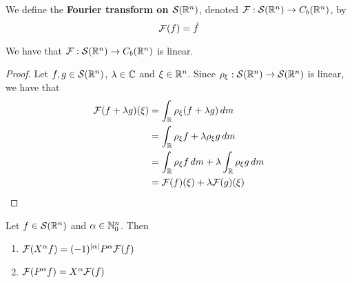 \documentclass{book}
\begin{document}
	\begin{defn}
		We define the \textbf{Fourier transform on $\mathcal{S}(\mathbb{R}^n)$}, denoted $\mathcal{F}: \mathcal{S}(\mathbb{R}^n) \rightarrow C_b(\mathbb{R}^n)$, by 
		$$\mathcal{F}(f) = \hat{f}$$
	\end{defn}
	
	\begin{ex}
		We have that $\mathcal{F}: \mathcal{S}(\mathbb{R}^n) \rightarrow C_b(\mathbb{R}^n)$ is linear. 
	\end{ex}
	
	\begin{proof}
		Let $f,g \in \mathcal{S}(\mathbb{R}^n)$, $\lambda \in \mathbb{C}$ and $\xi \in \mathbb{R}^n$. Since $\rho_{\xi}: \mathcal{S}(\mathbb{R}^n) \rightarrow \mathcal{S}(\mathbb{R}^n)$ is linear, we have that 
		\begin{align*}
			\mathcal{F}(f + \lambda g)(\xi) 
			& = \int_{\mathbb{R}} \rho_{\xi} (f + \lambda g) \, d m \\
			& = \int_{\mathbb{R}} \rho_{\xi}f + \lambda \rho_{\xi} g \, d m \\
			& = \int_{\mathbb{R}} \rho_{\xi} f \, d m + \lambda \int_{\mathbb{R}} \rho_{\xi} g \, d m \\
			&= \mathcal{F}(f)(\xi) + \lambda \mathcal{F}(g)(\xi)
		\end{align*}
	\end{proof}

	\begin{ex}
		Let $f \in \mathcal{S}(\mathbb{R}^n)$ and $\alpha \in \mathbb{N}_0^n$. Then 
		\begin{enumerate}
			\item $\mathcal{F}(X^{\alpha}f) = (-1)^{|\alpha|}P^{\alpha} \mathcal{F}(f)$ 
			\item $\mathcal{F}(P^{\alpha}f) = X^{\alpha} \mathcal{F}(f)$
		\end{enumerate}
	\end{ex}
	
\end{document}
